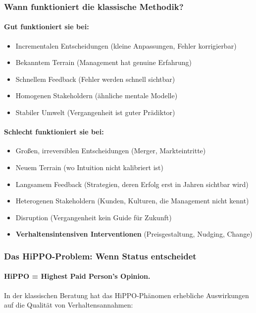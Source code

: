 \subsubsection{Wann funktioniert die klassische Methodik?}

\paragraph{Gut funktioniert sie bei:}
\begin{itemize}
    \item Incrementalen Entscheidungen (kleine Anpassungen, Fehler korrigierbar)
    \item Bekanntem Terrain (Management hat genuine Erfahrung)
    \item Schnellem Feedback (Fehler werden schnell sichtbar)
    \item Homogenen Stakeholdern (ähnliche mentale Modelle)
    \item Stabiler Umwelt (Vergangenheit ist guter Prädiktor)
\end{itemize}

\paragraph{Schlecht funktioniert sie bei:}
\begin{itemize}
    \item Großen, irreversiblen Entscheidungen (Merger, Markteintritte)
    \item Neuem Terrain (wo Intuition nicht kalibriert ist)
    \item Langsamem Feedback (Strategien, deren Erfolg erst in Jahren sichtbar wird)
    \item Heterogenen Stakeholdern (Kunden, Kulturen, die Management nicht kennt)
    \item Disruption (Vergangenheit kein Guide für Zukunft)
    \item \textbf{Verhaltensintensiven Interventionen} (Preisgestaltung, Nudging, Change)
\end{itemize}

\subsubsection{Das HiPPO-Problem: Wenn Status entscheidet}

\paragraph{HiPPO = Highest Paid Person's Opinion.}
In der klassischen Beratung hat das HiPPO-Phänomen erhebliche Auswirkungen auf die Qualität von Verhaltensannahmen:

